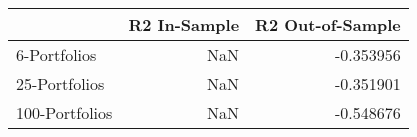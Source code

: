 \begin{tabular}{lrr}
\toprule
 & R2 In-Sample & R2 Out-of-Sample \\
\midrule
6-Portfolios & NaN & -0.353956 \\
25-Portfolios & NaN & -0.351901 \\
100-Portfolios & NaN & -0.548676 \\
\bottomrule
\end{tabular}
